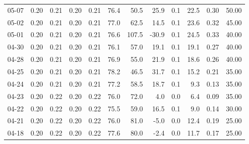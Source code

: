 \begin{threeparttable}
{\begin{tabular}{lrrrrrrrrrrr}
  05-07 &          0.20 &          0.21 &          0.20 &        0.21 &                76.4 &                50.5 &       25.9 &                 0.1 &             22.5 &            0.30 &                  50.00 \\
  05-02 &          0.20 &          0.21 &          0.20 &        0.21 &                77.0 &                62.5 &       14.5 &                 0.1 &             23.6 &            0.32 &                  45.00 \\
  05-01 &          0.20 &          0.21 &          0.20 &        0.21 &                76.6 &               107.5 &      -30.9 &                 0.1 &             24.5 &            0.33 &                  40.00 \\
  04-30 &          0.20 &          0.21 &          0.20 &        0.21 &                76.1 &                57.0 &       19.1 &                 0.1 &             19.1 &            0.27 &                  40.00 \\
  04-28 &          0.20 &          0.21 &          0.20 &        0.21 &                76.9 &                55.0 &       21.9 &                 0.1 &             18.6 &            0.26 &                  40.00 \\
  04-25 &          0.20 &          0.21 &          0.20 &        0.21 &                78.2 &                46.5 &       31.7 &                 0.1 &             15.2 &            0.21 &                  35.00 \\
  04-24 &          0.20 &          0.21 &          0.20 &        0.21 &                77.2 &                58.5 &       18.7 &                 0.1 &              9.3 &            0.13 &                  35.00 \\
  04-23 &          0.20 &          0.22 &          0.20 &        0.22 &                76.0 &                72.0 &        4.0 &                 0.0 &              6.4 &            0.09 &                  35.00 \\
  04-22 &          0.20 &          0.22 &          0.20 &        0.22 &                75.5 &                59.0 &       16.5 &                 0.1 &              9.0 &            0.14 &                  30.00 \\
  04-21 &          0.20 &          0.22 &          0.20 &        0.22 &                76.0 &                81.0 &       -5.0 &                 0.0 &             12.4 &            0.19 &                  25.00 \\
  04-18 &          0.20 &          0.22 &          0.20 &        0.22 &                77.6 &                80.0 &       -2.4 &                 0.0 &             11.7 &            0.17 &                  25.00 \\

\end{tabular}}
\end{threeparttable}
